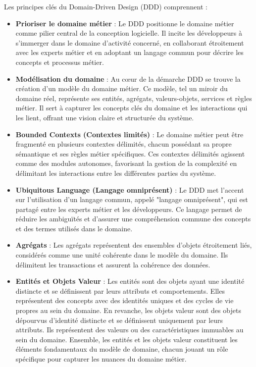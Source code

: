 Les principes clés du Domain-Driven Design (DDD) comprennent :
\begin{itemize}
    \item \textbf{Prioriser le domaine métier} : Le DDD positionne le domaine métier comme pilier central de la conception logicielle. Il incite les développeurs à s'immerger dans le domaine d'activité concerné, en collaborant étroitement avec les experts métier et en adoptant un langage commun pour décrire les concepts et processus métier.

    \item \textbf{Modélisation du domaine} : Au cœur de la démarche DDD se trouve la création d'un modèle du domaine métier. Ce modèle, tel un miroir du domaine réel, représente ses entités, agrégats, valeurs-objets, services et règles métier. Il sert à capturer les concepts clés du domaine et les interactions qui les lient, offrant une vision claire et structurée du système.

    \item \textbf{Bounded Contexts (Contextes limités)} : Le domaine métier peut être fragmenté en plusieurs contextes délimités, chacun possédant sa propre sémantique et ses règles métier spécifiques. Ces contextes délimités agissent comme des modules autonomes, favorisant la gestion de la complexité en délimitant les interactions entre les différentes parties du système.

    \item \textbf{Ubiquitous Language (Langage omniprésent)} : Le DDD met l'accent sur l'utilisation d'un langage commun, appelé "langage omniprésent", qui est partagé entre les experts métier et les développeurs. Ce langage permet de réduire les ambiguïtés et d'assurer une compréhension commune des concepts et des termes utilisés dans le domaine.

    \item \textbf{Agrégats} : Les agrégats représentent des ensembles d'objets étroitement liés, considérés comme une unité cohérente dans le modèle du domaine. Ils délimitent les transactions et assurent la cohérence des données.

    \item \textbf{Entités et Objets Valeur} : Les entités sont des objets ayant une identité distincte et se définissent par leurs attributs et comportements. Elles représentent des concepts avec des identités uniques et des cycles de vie propres au sein du domaine. En revanche, les objets valeur sont des objets dépourvus d'identité distincte et se définissent uniquement par leurs attributs. Ils représentent des valeurs ou des caractéristiques immuables au sein du domaine. Ensemble, les entités et les objets valeur constituent les éléments fondamentaux du modèle de domaine, chacun jouant un rôle spécifique pour capturer les nuances du domaine métier.
\end{itemize}

